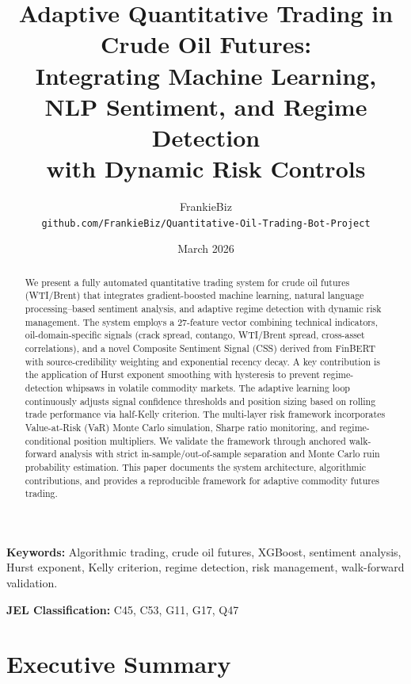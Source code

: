 \documentclass[12pt,a4paper]{article}
\title{
    \textbf{Adaptive Quantitative Trading in Crude Oil Futures:}\\[6pt]
    \large Integrating Machine Learning, NLP Sentiment, and Regime Detection\\
    with Dynamic Risk Controls
}
\author{
    FrankieBiz\\
    \texttt{github.com/FrankieBiz/Quantitative-Oil-Trading-Bot-Project}
}
\date{March 2026}
\begin{document}
\maketitle

\begin{abstract}
We present a fully automated quantitative trading system for crude oil futures (WTI/Brent) that integrates gradient-boosted machine learning, natural language processing--based sentiment analysis, and adaptive regime detection with dynamic risk management. The system employs a 27-feature vector combining technical indicators, oil-domain-specific signals (crack spread, contango, WTI/Brent spread, cross-asset correlations), and a novel Composite Sentiment Signal (CSS) derived from FinBERT with source-credibility weighting and exponential recency decay. A key contribution is the application of Hurst exponent smoothing with hysteresis to prevent regime-detection whipsaws in volatile commodity markets. The adaptive learning loop continuously adjusts signal confidence thresholds and position sizing based on rolling trade performance via half-Kelly criterion. The multi-layer risk framework incorporates Value-at-Risk (VaR) Monte Carlo simulation, Sharpe ratio monitoring, and regime-conditional position multipliers. We validate the framework through anchored walk-forward analysis with strict in-sample/out-of-sample separation and Monte Carlo ruin probability estimation. This paper documents the system architecture, algorithmic contributions, and provides a reproducible framework for adaptive commodity futures trading.
\end{abstract}

\vspace{8pt}
\noindent\textbf{Keywords:} Algorithmic trading, crude oil futures, XGBoost, sentiment analysis, Hurst exponent, Kelly criterion, regime detection, risk management, walk-forward validation.

\vspace{8pt}
\noindent\textbf{JEL Classification:} C45, C53, G11, G17, Q47

\newpage
\section*{Executive Summary}
\end{document}

